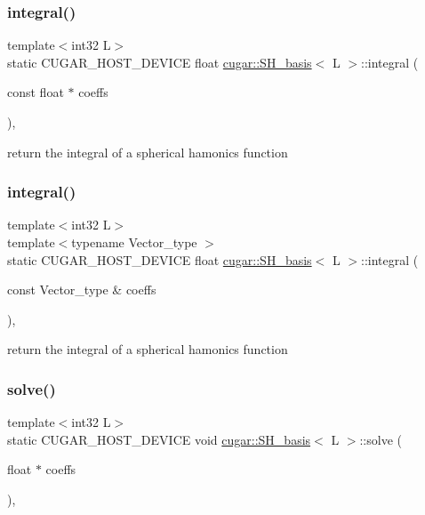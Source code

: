 \subsubsection{\texorpdfstring{integral()}{integral()}\hspace{0.1cm}{\footnotesize\ttfamily [1/2]}}
{\footnotesize\ttfamily template$<$int32 L$>$ \\
static C\+U\+G\+A\+R\+\_\+\+H\+O\+S\+T\+\_\+\+D\+E\+V\+I\+CE float \hyperlink{structcugar_1_1_s_h__basis}{cugar\+::\+S\+H\+\_\+basis}$<$ L $>$\+::integral (\begin{DoxyParamCaption}\item[{const float $\ast$}]{coeffs }\end{DoxyParamCaption})\hspace{0.3cm}{\ttfamily [inline]}, {\ttfamily [static]}}

return the integral of a spherical hamonics function \mbox{\label{structcugar_1_1_s_h__basis_a8a6a16022c216964f777d7d6668a739c}} 
\subsubsection{\texorpdfstring{integral()}{integral()}\hspace{0.1cm}{\footnotesize\ttfamily [2/2]}}
{\footnotesize\ttfamily template$<$int32 L$>$ \\
template$<$typename Vector\+\_\+type $>$ \\
static C\+U\+G\+A\+R\+\_\+\+H\+O\+S\+T\+\_\+\+D\+E\+V\+I\+CE float \hyperlink{structcugar_1_1_s_h__basis}{cugar\+::\+S\+H\+\_\+basis}$<$ L $>$\+::integral (\begin{DoxyParamCaption}\item[{const Vector\+\_\+type \&}]{coeffs }\end{DoxyParamCaption})\hspace{0.3cm}{\ttfamily [inline]}, {\ttfamily [static]}}

return the integral of a spherical hamonics function \mbox{\label{structcugar_1_1_s_h__basis_abf09a4757b23d89f9691753746fd1649}} 
\subsubsection{\texorpdfstring{solve()}{solve()}}
{\footnotesize\ttfamily template$<$int32 L$>$ \\
static C\+U\+G\+A\+R\+\_\+\+H\+O\+S\+T\+\_\+\+D\+E\+V\+I\+CE void \hyperlink{structcugar_1_1_s_h__basis}{cugar\+::\+S\+H\+\_\+basis}$<$ L $>$\+::solve (\begin{DoxyParamCaption}\item[{float $\ast$}]{coeffs }\end{DoxyParamCaption})\hspace{0.3cm}{\ttfamily [inline]}, {\ttfamily [static]}}

